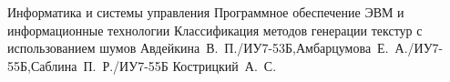 \makeresearchtitle
{Информатика и системы управления} %
{Программное обеспечение ЭВМ и информационные технологии} %
{Классификация методов генерации текстур с использованием шумов} %
{Авдейкина~В.~П./ИУ7-53Б,Амбарцумова~Е.~А./ИУ7-55Б,Саблина~П.~Р./ИУ7-55Б} %
{Кострицкий~А.~С.} %
{} %
